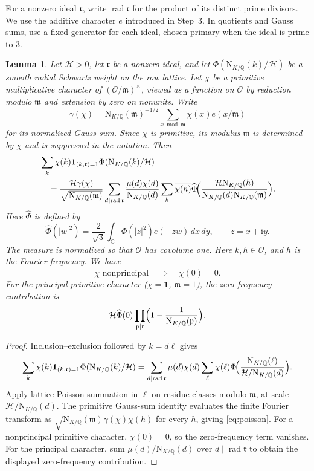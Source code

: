 \documentclass[11pt,a4paper]{article}
\numberwithin{equation}{section}
\numberwithin{figure}{section}
\newtheorem{lemma}[theorem]{Lemma}
\theoremstyle{definition}
\theoremstyle{remark}
\newcommand{\Q}{\mathbb Q}
\newcommand{\NK}{\mathrm N_{K/\Q}}
\newcommand{\OO}{\mathcal O}
\newcommand{\ind}{\mathbf1}
\newcommand{\rad}{\operatorname{rad}}
\begin{document}
For a nonzero ideal $\mathfrak r$, write $\rad \mathfrak r$ for the product of
its distinct prime divisors. We use the additive character $e$
introduced in Step~3. In quotients and Gauss sums, use a fixed
generator for each ideal, chosen primary when the ideal is prime to $3$.

\begin{lemma}\label{lem:poisson}
Let $\mathcal H>0$, let $\mathfrak r$ be a nonzero ideal, and let
$\Phi(\NK(k)/\mathcal H)$ be a smooth radial Schwartz weight
on the row lattice. Let $\chi$ be a primitive multiplicative character
of $(\OO/\mathfrak m)^\times$, viewed as a function on $\OO$ by
reduction modulo $\mathfrak m$ and extension by zero on nonunits.
Write 
\[
\gamma(\chi)=\NK(\mathfrak m)^{-1/2}
\sum_{x\bmod\mathfrak m}\chi(x)e(x/\mathfrak m)
\]
for its normalized Gauss sum.
Since $\chi$ is primitive, its modulus $\mathfrak m$ is determined by $\chi$ and is suppressed in the notation. Then
\begin{equation}\label{eq:poisson}
 \begin{aligned}
 &\sum_k\chi(k)\ind_{(k,\mathfrak r)=1}\Phi(\NK(k)/\mathcal{H})\\
 &\quad=\frac{\mathcal{H}\gamma(\chi)}{\sqrt{\NK(\mathfrak m)}}
   \sum_{d\mid\rad \mathfrak r}\frac{\mu(d)\chi(d)}{\NK(d)}
   \sum_h\overline{\chi(h)}
        \widehat\Phi\!\Bigl(\frac{\mathcal{H}\NK(h)}{\NK(d)\NK(\mathfrak m)}\Bigr).
 \end{aligned}
\end{equation}
Here $\widehat\Phi$ is defined by
\[
 \widehat\Phi(|w|^2)=\frac2{\sqrt3}\int_{\mathbb C}
       \Phi(|z|^2)e(-zw)\,dx\,dy,\qquad z=x+\mathrm i y.
\]
The measure is normalized so that $\OO$ has covolume one.
Here $k,h\in\OO$, and $h$ is the Fourier frequency. We have
\[
 \chi\text{ nonprincipal}\quad\Longrightarrow\quad
 \overline{\chi(0)}=0.
\]
For the principal primitive character ($\chi=\mathbf1$, $\mathfrak m=1$),
the zero-frequency contribution is
\[
 \mathcal H\widehat\Phi(0)
   \prod_{\mathfrak p\mid \mathfrak r}\Bigl(1-\frac1{\NK(\mathfrak p)}\Bigr).
\]
\end{lemma}

\begin{proof}
Inclusion--exclusion followed by $k=d\ell$ gives
\[
 \sum_k\chi(k)\ind_{(k,\mathfrak r)=1}\Phi(\NK(k)/\mathcal{H})
 =\sum_{d\mid\rad \mathfrak r}\mu(d)\chi(d)
       \sum_\ell\chi(\ell)\Phi\!\Bigl(\frac{\NK(\ell)}{\mathcal{H}/\NK(d)}\Bigr).
\]
Apply lattice Poisson summation \cite[Theorem~4.5]{IK04} in $\ell$
on residue classes modulo $\mathfrak m$, at scale $\mathcal H/\NK(d)$.
The primitive Gauss-sum identity \cite[(3.12)]{IK04} evaluates the
finite Fourier transform as
$\sqrt{\NK(\mathfrak m)}\gamma(\chi)\overline{\chi(h)}$
for every $h$, giving \eqref{eq:poisson}. For a nonprincipal primitive
character, $\overline{\chi(0)}=0$, so the zero-frequency term vanishes.
For the principal character, sum $\mu(d)/\NK(d)$ over
$d\mid\rad \mathfrak r$ to obtain the displayed zero-frequency contribution.
\end{proof}
\end{document}
